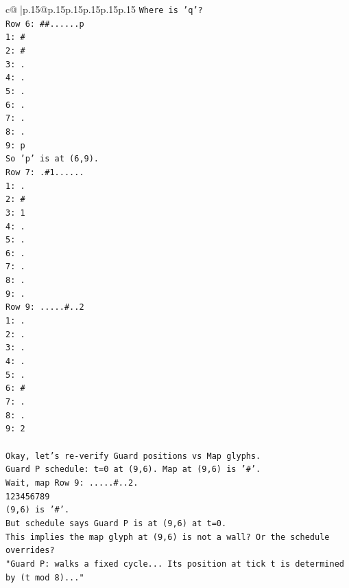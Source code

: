 \documentclass{article}
\begin{document}
{\begin{supertabular}{c@{$\;$}|p{.15\linewidth}@{}p{.15\linewidth}p{.15\linewidth}p{.15\linewidth}p{.15\linewidth}p{.15\linewidth}}
{{{\texttt{Where is 'q'?} \\
\texttt{Row 6: \#\#......p} \\
\texttt{1: \#} \\
\texttt{2: \#} \\
\texttt{3: .} \\
\texttt{4: .} \\
\texttt{5: .} \\
\texttt{6: .} \\
\texttt{7: .} \\
\texttt{8: .} \\
\texttt{9: p} \\
\texttt{So 'p' is at (6,9).} \\
\texttt{Row 7: .\#1......} \\
\texttt{1: .} \\
\texttt{2: \#} \\
\texttt{3: 1} \\
\texttt{4: .} \\
\texttt{5: .} \\
\texttt{6: .} \\
\texttt{7: .} \\
\texttt{8: .} \\
\texttt{9: .} \\
\texttt{Row 9: .....\#..2} \\
\texttt{1: .} \\
\texttt{2: .} \\
\texttt{3: .} \\
\texttt{4: .} \\
\texttt{5: .} \\
\texttt{6: \#} \\
\texttt{7: .} \\
\texttt{8: .} \\
\texttt{9: 2} \\
\\ 
\texttt{Okay, let's re{-}verify Guard positions vs Map glyphs.} \\
\texttt{Guard P schedule: t=0 at (9,6). Map at (9,6) is '\#'.} \\
\texttt{Wait, map Row 9: .....\#..2.} \\
\texttt{123456789} \\
\texttt{(9,6) is '\#'.} \\
\texttt{But schedule says Guard P is at (9,6) at t=0.} \\
\texttt{This implies the map glyph at (9,6) is not a wall? Or the schedule overrides?} \\
\texttt{"Guard P: walks a fixed cycle... Its position at tick t is determined by (t mod 8)..."} \\
}}}
\end{supertabular}}
\end{document}
